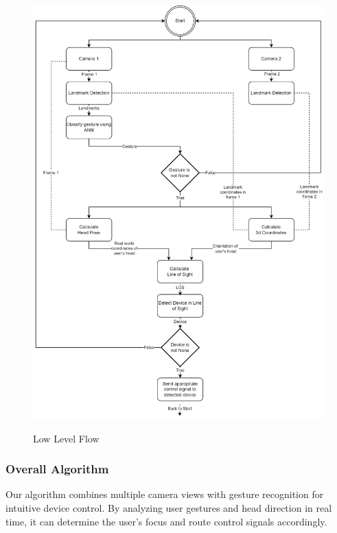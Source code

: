\begin{figure}[!t]
	\centering
	\includegraphics[scale=1.7]{images/low_level_flow.drawio.png} \\
	\caption{ Low Level Flow }
	\label{fig: Low Level Flow }
\end{figure}

\subsubsection{Overall Algorithm}

Our algorithm combines multiple camera views with gesture recognition for intuitive device control. By analyzing user gestures and head direction in real time, it can determine the user's focus and route control signals accordingly.

